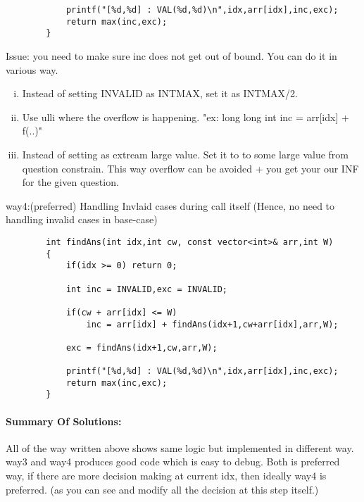\begin{solution}
\begin{verbatim}
            printf("[%d,%d] : VAL(%d,%d)\n",idx,arr[idx],inc,exc);
            return max(inc,exc);
        }
    \end{verbatim}

Issue: you need to make sure inc does not get out of bound. You can do it in various way.


\begin{enumerate}[(i)]
    \item Instead of setting INVALID as INTMAX, set it as INTMAX/2.
    \item Use ulli where the overflow is happening. "ex: long long int inc = arr[idx] + f(..)"
    \item Instead of setting as extream large value. Set it to to some large value from question constrain. This way overflow can be avoided + you get your our INF for the given question.
\end{enumerate} 


way4:(preferred) Handling Invlaid cases during call itself (Hence, no need to handling invalid cases in base-case)

    \begin{verbatim}
        int findAns(int idx,int cw, const vector<int>& arr,int W)
        {
            if(idx >= 0) return 0;

            int inc = INVALID,exc = INVALID;

            if(cw + arr[idx] <= W)
                inc = arr[idx] + findAns(idx+1,cw+arr[idx],arr,W);
            
            exc = findAns(idx+1,cw,arr,W);

            printf("[%d,%d] : VAL(%d,%d)\n",idx,arr[idx],inc,exc);
            return max(inc,exc);
        }
    \end{verbatim}

    \paragraph{Summary Of Solutions:} All of the way written above shows same logic but implemented in different way.
    way3 and way4 produces good code which is easy to debug.
    Both is preferred way, if there are more decision making at current idx, then ideally way4 is preferred. (as you can see and modify all the decision at this step itself.)

\end{solution}